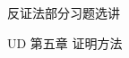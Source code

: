 \begin{frame}{}
  \centerline{\LARGE 反证法部分习题选讲}
  \vspace{0.50cm}
  \centerline{\large UD 第五章 \; 证明方法}
\end{frame}

\begin{frame}{}
\end{frame}
